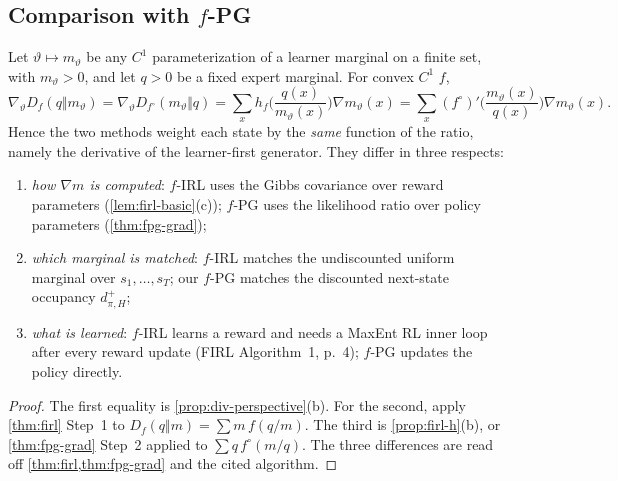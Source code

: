 \subsection{Comparison with \texorpdfstring{$f$}{f}-PG}\label{sec:firl-compare}

\begin{proposition}\label{prop:firl-compare}
Let $\vartheta\mapsto m_\vartheta$ be any $C^1$ parameterization of a learner marginal on a finite set, with $m_\vartheta>0$, and let $q>0$ be a fixed expert marginal.
For convex $C^1$ $f$,
\[
\nabla_\vartheta D_f(q\Vert m_\vartheta)=\nabla_\vartheta D_{f^\circ}(m_\vartheta\Vert q)=\sum_xh_f\Big(\frac{q(x)}{m_\vartheta(x)}\Big)\nabla m_\vartheta(x)=\sum_x(f^\circ)'\Big(\frac{m_\vartheta(x)}{q(x)}\Big)\nabla m_\vartheta(x).
\]
Hence the two methods weight each state by the \emph{same} function of the ratio, namely the derivative of the learner-first generator. They differ in three respects:
\begin{enumerate}[nosep,label=(\roman*)]
\item \emph{how $\nabla m$ is computed}: $f$-IRL uses the Gibbs covariance over reward parameters (\cref{lem:firl-basic}(c)); $f$-PG uses the likelihood ratio over policy parameters (\cref{thm:fpg-grad});
\item \emph{which marginal is matched}: $f$-IRL matches the undiscounted uniform marginal over $s_1,\dots,s_T$; our $f$-PG matches the discounted next-state occupancy $d^+_{\pi,H}$;
\item \emph{what is learned}: $f$-IRL learns a reward and needs a MaxEnt RL inner loop after every reward update (FIRL Algorithm~1, p.~4); $f$-PG updates the policy directly.
\end{enumerate}
\end{proposition}
\begin{proof}
The first equality is \cref{prop:div-perspective}(b).
For the second, apply \cref{thm:firl} Step~1 to $D_f(q\Vert m)=\sum m\,f(q/m)$.
The third is \cref{prop:firl-h}(b), or \cref{thm:fpg-grad} Step~2 applied to $\sum q\,f^\circ(m/q)$.
The three differences are read off \cref{thm:firl,thm:fpg-grad} and the cited algorithm.
\end{proof}

